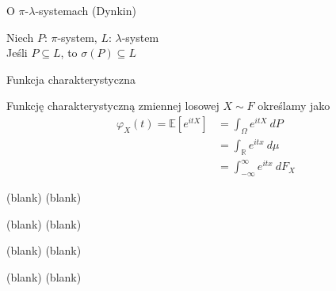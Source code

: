\documentclass[avery5371,grid,frame]{flashcards}
\begin{document}
\begin{flashcard}[Twierdzenie]{O $\pi$-$\lambda$-systemach (Dynkin)}

\smallskip
Niech $\mathit{P}$: $\pi$-system, $\mathit{L}$: $\lambda$-system \\
Jeśli $\mathit{P} \subseteq \mathit{L}$, to $\sigma(\mathit{P}) \subseteq \mathit{L}$
\end{flashcard}

\begin{flashcard}[Definicja]{Funkcja charakterystyczna}

\smallskip
Funkcję charakterystyczną zmiennej losowej $X \sim F$ określamy jako
{\begin{align*}
\varphi_X(t) = \mathbb{E} \left[ e^{itX} \right] &= \int_{\Omega} e^{itX} \ dP \\
             &= \int_{\mathbb{R}} e^{itx} \ d \mu \\
             &= \int_{-\infty}^{\infty} e^{itx} \ dF_X 
\end{align*}}
\end{flashcard}

\begin{flashcard}[Twierdzenie]{(blank)}
(blank)
\end{flashcard}
\begin{flashcard}[Twierdzenie]{(blank)}
(blank)
\end{flashcard}
\begin{flashcard}[Twierdzenie]{(blank)}
(blank)
\end{flashcard}
\begin{flashcard}[Twierdzenie]{(blank)}
(blank)
\end{flashcard}
\end{document}
